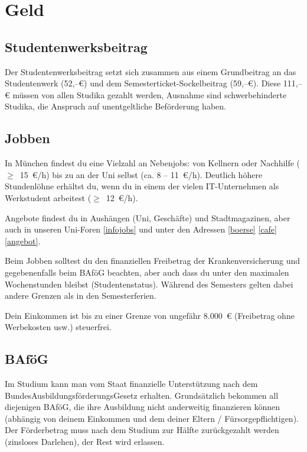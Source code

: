 ﻿\chapter{Geld}

\section{Studentenwerksbeitrag}
Der Studentenwerksbeitrag setzt sich zusammen aus einem Grundbeitrag an das Studentenwerk (52,--€) und dem
Semesterticket-Sockelbeitrag (59,--€).
Diese 111,--€ müssen von allen Studika gezahlt werden, Ausnahme sind schwerbehinderte Studika, die Anspruch
auf unentgeltliche Beförderung haben.%

\section{Jobben}
In München findest du eine Vielzahl an Nebenjobs: von Kellnern oder Nachhilfe ($\geq$~15~€/h) bis zu an der Uni selbst (ca. 8 -- 11~€/h). Deutlich höhere Stundenlöhne erhältst du, wenn du in einem der vielen IT-Unternehmen als Werkstudent arbeitest ($\geq$~12~€/h).

Angebote findest du in Aushängen (Uni, Geschäfte) und Stadtmagazinen, aber auch in unseren Uni-Foren \ref{infojobs} und unter den Adressen
\ref{boerse} \ref{cafe} \ref{angebot}.

Beim Jobben solltest du den finanziellen Freibetrag der Krankenversicherung und gegebenenfalls beim BAföG beachten, aber auch dass du unter den maximalen Wochenstunden bleibst (Studentenstatus). Während des Semesters gelten dabei andere Grenzen als in den Semesterferien.

Dein Einkommen ist bis zu einer Grenze von ungefähr 8.000~€ (Freibetrag ohne Werbekosten usw.) steuerfrei.

\begin{urlList}
\end{urlList}


\section{BAföG}
Im Studium kann man vom Staat finanzielle Unterstützung nach dem BundesAusbildungsförderungsGesetz erhalten. Grundsätzlich bekommen all diejenigen BAföG, die ihre Ausbildung nicht anderweitig finanzieren können (abhängig von deinem Einkommen und dem deiner Eltern / Fürsorgepflichtigen). Der Förderbetrag muss nach dem Studium zur Hälfte zurückgezahlt werden (zinsloses Darlehen), der Rest wird erlassen.

